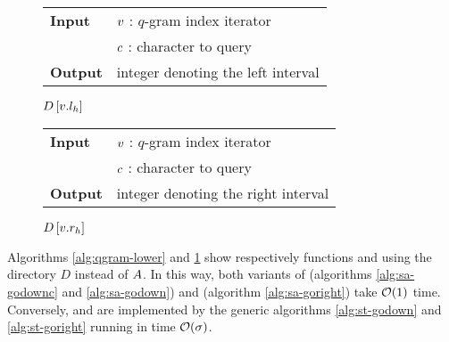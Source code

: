 \begin{figure*}[b!]
\begin{minipage}[b]{.5\textwidth}
\begin{algorithm}[H]
\begin{tabular}{ll}
\textbf{Input}  & $v$ : $q$-gram index iterator\\
				& $c$ : character to query\\
\textbf{Output} & integer denoting the left interval\\
\end{tabular}
\begin{algorithmic}[1]
\State \Return $D\left[v.l_h\right]$
\end{algorithmic}
\label{alg:qgram-lower}
\end{algorithm}
\end{minipage}
\hfill
\begin{minipage}[b]{.5\textwidth}
\begin{algorithm}[H]
\begin{tabular}{ll}
\textbf{Input}  & $v$ : $q$-gram index iterator\\
				& $c$ : character to query\\
\textbf{Output} & integer denoting the right interval\\
\end{tabular}
\begin{algorithmic}[1]
\State \Return $D\left[v.r_h\right]$
\end{algorithmic}
\label{alg:qgram-upper}
\end{algorithm}
\end{minipage}
\vspace{10mm}
\end{figure*}

Algorithms \ref{alg:qgram-lower} and \ref{alg:qgram-upper} show respectively functions  and  using the directory $D$ instead of $A$.
In this way, both variants of  (algorithms \ref{alg:sa-godownc} and \ref{alg:sa-godown}) and  (algorithm \ref{alg:sa-goright}) take $\mathcal{O}(1)$ time.
Conversely,  and  are implemented by the generic algorithms \ref{alg:st-godown} and \ref{alg:st-goright} running in time $\mathcal{O}(\sigma)$.

